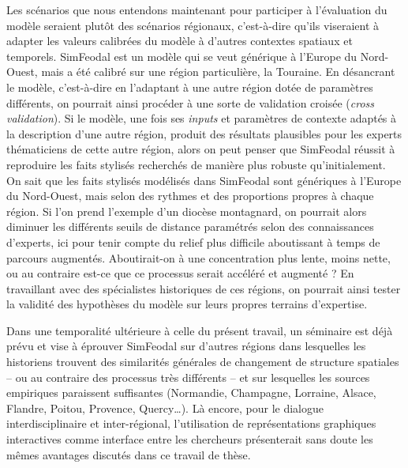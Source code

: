 \noindent Les scénarios que nous entendons maintenant pour participer à l'évaluation du modèle seraient plutôt des scénarios régionaux, c'est-à-dire qu'ils viseraient à adapter les valeurs calibrées du modèle à d'autres contextes spatiaux et temporels.
SimFeodal est un modèle qui se veut générique à l'Europe du Nord-Ouest, mais a été calibré sur une région particulière, la Touraine.
En désancrant le modèle, c'est-à-dire en l'adaptant à une autre région dotée de paramètres différents, on pourrait ainsi procéder à une sorte de validation croisée (\textit{cross validation}).
Si le modèle, une fois ses \textit{inputs} et paramètres de contexte adaptés à la description d'une autre région, produit des résultats plausibles pour les experts thématiciens de cette autre région, alors on peut penser que SimFeodal réussit à reproduire les faits stylisés recherchés de manière plus robuste qu'initialement.
On sait que les faits stylisés modélisés dans SimFeodal sont génériques à l'Europe du Nord-Ouest, mais selon des rythmes et des proportions propres à chaque région.
Si l'on prend l'exemple d'un diocèse montagnard, on pourrait alors diminuer les différents seuils de distance paramétrés selon des connaissances d'experts, ici pour tenir compte du relief plus difficile aboutissant à temps de parcours augmentés.
Aboutirait-on à une concentration plus lente, moins nette, ou au contraire est-ce que ce processus serait accéléré et augmenté ?
En travaillant avec des spécialistes historiques de ces régions, on pourrait ainsi tester la validité des hypothèses du modèle sur leurs propres terrains d'expertise.

Dans une temporalité ultérieure à celle du présent travail, un séminaire est déjà prévu et vise à éprouver SimFeodal sur d'autres régions dans lesquelles les historiens trouvent des similarités générales de changement de structure spatiales -- ou au contraire des processus très différents -- et sur lesquelles les sources empiriques paraissent suffisantes (Normandie, Champagne, Lorraine, Alsace, Flandre, Poitou, Provence, Quercy\ldots).
Là encore, pour le dialogue interdisciplinaire et inter-régional, l'utilisation de représentations graphiques interactives comme interface entre les chercheurs présenterait sans doute les mêmes avantages discutés dans ce travail de thèse.


